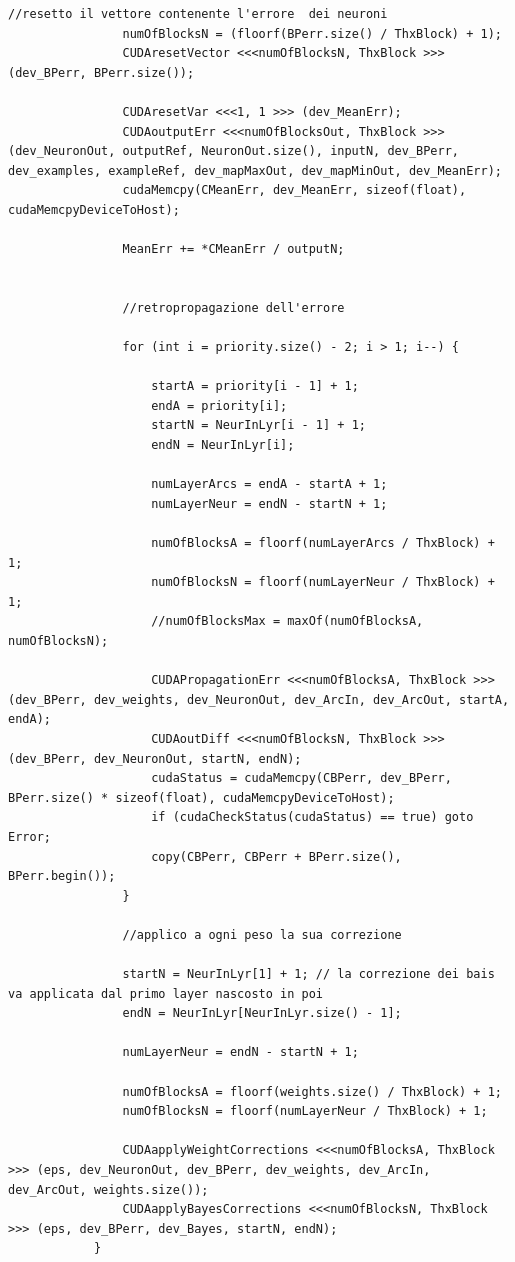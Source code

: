 \documentclass[10pt,a4paper]{article}
\begin{document}
\begin{lstlisting}[style=mycuda, caption= classe di interfaccia alla GPU, captionpos=b]
				//resetto il vettore contenente l'errore  dei neuroni
				numOfBlocksN = (floorf(BPerr.size() / ThxBlock) + 1);
				CUDAresetVector <<<numOfBlocksN, ThxBlock >>> (dev_BPerr, BPerr.size());

				CUDAresetVar <<<1, 1 >>> (dev_MeanErr);
				CUDAoutputErr <<<numOfBlocksOut, ThxBlock >>> (dev_NeuronOut, outputRef, NeuronOut.size(), inputN, dev_BPerr, dev_examples, exampleRef, dev_mapMaxOut, dev_mapMinOut, dev_MeanErr);
				cudaMemcpy(CMeanErr, dev_MeanErr, sizeof(float), cudaMemcpyDeviceToHost);

				MeanErr += *CMeanErr / outputN;


				//retropropagazione dell'errore

				for (int i = priority.size() - 2; i > 1; i--) {

					startA = priority[i - 1] + 1;
					endA = priority[i];
					startN = NeurInLyr[i - 1] + 1;
					endN = NeurInLyr[i];

					numLayerArcs = endA - startA + 1;
					numLayerNeur = endN - startN + 1;

					numOfBlocksA = floorf(numLayerArcs / ThxBlock) + 1;
					numOfBlocksN = floorf(numLayerNeur / ThxBlock) + 1;
					//numOfBlocksMax = maxOf(numOfBlocksA, numOfBlocksN);

					CUDAPropagationErr <<<numOfBlocksA, ThxBlock >>> (dev_BPerr, dev_weights, dev_NeuronOut, dev_ArcIn, dev_ArcOut, startA, endA);
					CUDAoutDiff <<<numOfBlocksN, ThxBlock >>> (dev_BPerr, dev_NeuronOut, startN, endN);
					cudaStatus = cudaMemcpy(CBPerr, dev_BPerr, BPerr.size() * sizeof(float), cudaMemcpyDeviceToHost);
					if (cudaCheckStatus(cudaStatus) == true) goto Error;
					copy(CBPerr, CBPerr + BPerr.size(), BPerr.begin());
				}

				//applico a ogni peso la sua correzione

				startN = NeurInLyr[1] + 1; // la correzione dei bais va applicata dal primo layer nascosto in poi
				endN = NeurInLyr[NeurInLyr.size() - 1];

				numLayerNeur = endN - startN + 1;

				numOfBlocksA = floorf(weights.size() / ThxBlock) + 1;
				numOfBlocksN = floorf(numLayerNeur / ThxBlock) + 1;

				CUDAapplyWeightCorrections <<<numOfBlocksA, ThxBlock >>> (eps, dev_NeuronOut, dev_BPerr, dev_weights, dev_ArcIn, dev_ArcOut, weights.size());
				CUDAapplyBayesCorrections <<<numOfBlocksN, ThxBlock >>> (eps, dev_BPerr, dev_Bayes, startN, endN);
			}


\end{lstlisting}
\end{document}
